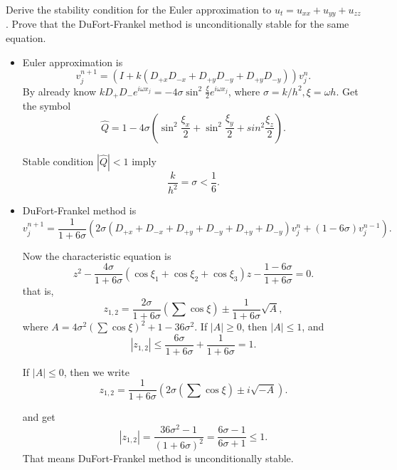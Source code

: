 \exc Derive the stability condition for the Euler 
approximation to $u_t = u_{xx} +
u_{yy} + u_{zz}$ . Prove that the DuFort-Frankel 
method is unconditionally stable for the same equation.

\begin{solution}
  \begin{itemize}
    \item 
  Euler approximation is 
  \[v_j^{n+1} = (I + k(D_{+x}D_{-x}+ D_{+y}D_{-y}+
  D_{+y}D_{-y}) )v_j^n.\]
  By already know $kD_{+}D_{-} e^{i\omega x_j} = -4\sigma \sin^2
   \frac{\xi }{2} e^{i\omega x_j} $,
   where $\sigma = k/h^2, \xi = \omega h$. Get the symbol 
   \[\hat{Q} = 1 - 4\sigma ( \sin^2\frac{\xi_x }{2} +
   \sin^2\frac{\xi_y }{2} + sin^2\frac{\xi_z }{2}).\]
   
   Stable condition $| \hat{Q}| < 1$ imply
     \[\frac{k}{h^2} = \sigma < \frac{1}{6}.\]

\item DuFort-Frankel method is 
 \[v_j^{n+1} = \frac{1}{1 + 6\sigma}(
   2\sigma(D_{+x} + D_{-x} + D_{+y} + D_{-y}+
   D_{+y} + D_{-y}) v_j^{n} + (1 - 6\sigma )v_j^{n-1}).\]

   Now the characteristic equation is
   \[z^2 - \frac{4\sigma}{1 + 6\sigma}(\cos \xi_1 
   + \cos \xi_2 + \cos \xi_3)z - \frac{1 - 6\sigma}{1 + 6\sigma} = 0.\]
   that is,
   \[z_{1, 2} = \frac{2\sigma}{1 + 6\sigma}(\sum \cos\xi)
   \pm \frac{1}{1 + 6\sigma}\sqrt{A},\]
   where $A = 4\sigma^2(\sum \cos \xi)^2  + 1 - 36\sigma^2$.
    If $|A| \geq 0$, then $|A| \le 1$, and 
    \[|z_{1, 2}| \le \frac{6 \sigma}{1 + 6\sigma} + \frac{1}{1 + 6\sigma} = 1.\]

    If $|A| \le 0$, then we write 
    \[z_{1, 2} = \frac{1}{1 + 6\sigma}(2\sigma(
      \sum \cos \xi
    ) \pm i \sqrt{-A}).\]

    and get 
    \[|z_{1, 2}| = \frac{36 \sigma^2 - 1 }{(1 + 6 \sigma)^2}
    = \frac{6\sigma -1}{6\sigma +1} \le 1.\]
    That means DuFort-Frankel method is unconditionally stable.
    \end{itemize}
\end{solution}

